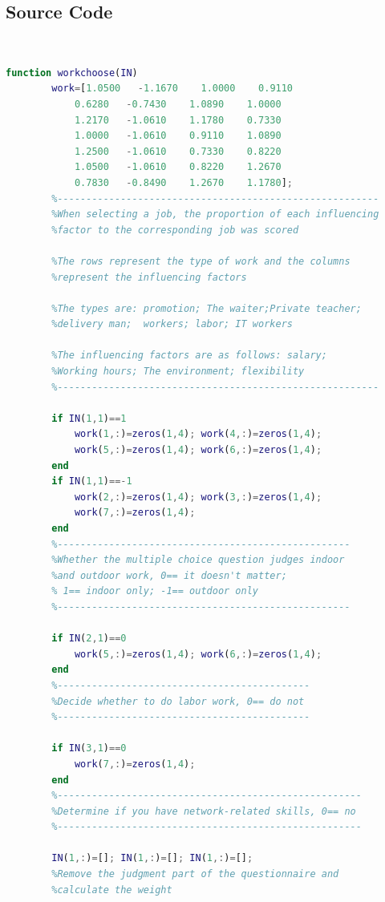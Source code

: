 \documentclass[12pt]{article}
\begin{document}
\begin{appendix}
    \subsection{Source Code}
    ~~\begin{lstlisting}[language=Matlab]
        function workchoose(IN)
        work=[1.0500   -1.1670    1.0000    0.9110
            0.6280   -0.7430    1.0890    1.0000
            1.2170   -1.0610    1.1780    0.7330
            1.0000   -1.0610    0.9110    1.0890
            1.2500   -1.0610    0.7330    0.8220
            1.0500   -1.0610    0.8220    1.2670
            0.7830   -0.8490    1.2670    1.1780];
        %--------------------------------------------------------
        %When selecting a job, the proportion of each influencing 
        %factor to the corresponding job was scored

        %The rows represent the type of work and the columns 
        %represent the influencing factors

        %The types are: promotion; The waiter;Private teacher; 
        %delivery man;  workers; labor; IT workers

        %The influencing factors are as follows: salary; 
        %Working hours; The environment; flexibility
        %--------------------------------------------------------

        if IN(1,1)==1
            work(1,:)=zeros(1,4); work(4,:)=zeros(1,4);
            work(5,:)=zeros(1,4); work(6,:)=zeros(1,4);
        end
        if IN(1,1)==-1
            work(2,:)=zeros(1,4); work(3,:)=zeros(1,4);
            work(7,:)=zeros(1,4);
        end
        %---------------------------------------------------
        %Whether the multiple choice question judges indoor 
        %and outdoor work, 0== it doesn't matter;
        % 1== indoor only; -1== outdoor only
        %---------------------------------------------------

        if IN(2,1)==0
            work(5,:)=zeros(1,4); work(6,:)=zeros(1,4);
        end
        %--------------------------------------------
        %Decide whether to do labor work, 0== do not
        %--------------------------------------------

        if IN(3,1)==0
            work(7,:)=zeros(1,4);
        end
        %-----------------------------------------------------
        %Determine if you have network-related skills, 0== no
        %-----------------------------------------------------

        IN(1,:)=[]; IN(1,:)=[]; IN(1,:)=[];
        %Remove the judgment part of the questionnaire and 
        %calculate the weight


\end{lstlisting}
\end{appendix}
\end{document}
